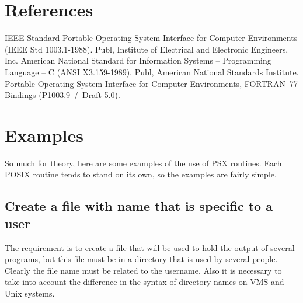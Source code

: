 \documentclass[twoside,11pt]{article}
\newcommand{\stardocinitials}  {SUN}
\newcommand{\stardocnumber}    {121.5}
\newcommand{\stardocname}{\stardocinitials /\stardocnumber}
\newcommand{\xlabel}[1]{}
\renewcommand{\_}{\texttt{\symbol{95}}}
\begin{document}
\section{\xlabel{references}References}
\begin{thebibliography}{9}
IEEE Standard Portable Operating System Interface for Computer
Environments (IEEE Std 1003.1-1988). Publ, Institute of Electrical and
Electronic Engineers, Inc.
American National Standard for Information Systems --
Programming Language -- C (ANSI X3.159-1989). Publ, American National Standards
Institute.
Portable Operating System Interface for Computer
Environments, FORTRAN~77 Bindings (P1003.9~/~Draft 5.0).
\end{thebibliography}

\newpage
\appendix

\section{\xlabel{examples}Examples}

So much for theory, here are some examples of the use of PSX routines. Each
POSIX routine tends to stand on its own, so the examples are fairly simple.

\subsection{\xlabel{create_a_file_with_name_that_is_specific_to_a_user}Create a file with name that is specific to a user}

The requirement is to create a file that will be used to hold the output of
several programs, but this file must be in a directory that is used by several
people. Clearly the file name must be related to the username. Also it is
necessary to take into account the difference in the syntax of directory names
on VMS and Unix systems.
\end{document}
